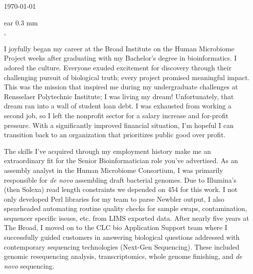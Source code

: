 \documentclass[10pt,letterpaper]{article}
\newcommand{\titleto}[1]{\renewcommand{\titleto}{#1}}
\newcommand{\nameto}[1]{\renewcommand{\nameto}{#1}}
\newcommand{\addrto}[1]{\renewcommand{\addrto}{#1}}
\begin{document}

\begin{flushright}
    \today
\end{flushright}


\nameto \\
\addrto

Dear \titleto \hspace{0.3 mm} \nameto,


I joyfully began my career at the Broad Institute on the Human Microbiome Project weeks after graduating with my Bachelor’s degree in bioinformatics. I adored the culture. Everyone exuded excitement for discovery through their challenging pursuit of biological truth; every project promised meaningful impact. This was the mission that inspired me during my undergraduate challenges at Rensselaer Polytechnic Institute; I was living my dream! Unfortunately, that dream ran into a wall of student loan debt. I was exhausted from working a second job, so I left the nonprofit sector for a  salary increase and for-profit pressure. With a significantly improved financial situation, I'm hopeful I can transition back to an organization that prioritizes public good over profit.

The skills I've acquired through my employment history make me an extraordinary fit for the Senior Bioinformatician role you've advertised. As an assembly analyst in the Human Microbiome Consortium, I was primarily responsible for \textit{de novo} assembling draft bacterial genomes. Due to Illumina's (then Solexa) read length constraints we depended on 454 for this work. I not only developed Perl libraries for my team to parse Newbler output, I also spearheaded automating routine quality checks for sample swaps, contamination, sequencer specific issues, etc. from LIMS exported data.
After nearly five years at The Broad, I moved on to the CLC bio Application Support team where I successfully guided customers in answering biological questions addressed with contemporary sequencing technologies (Next-Gen Sequencing). These included genomic resequencing analysis, transcriptomics, whole genome finishing, and \textit{de novo} sequencing.
\end{document}
